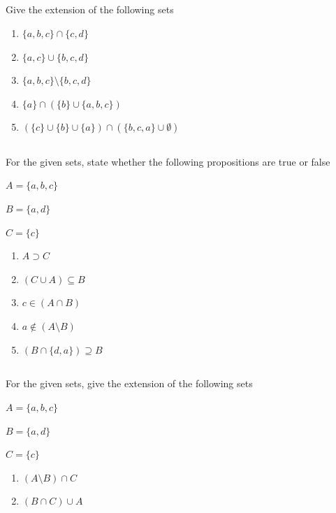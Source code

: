 \documentclass[twocolumn]{article}
\begin{document}
\subsection{}

    Give the extension of the following sets

    \begin{enumerate}
        \item $\{ a, b, c \} \cap \{ c, d \} $
        \item $\{ a, c \} \cup \{ b, c, d \} $
        \item $\{ a, b, c \} \setminus \{ b, c, d \} $
        \item $\{ a \} \cap ( \{ b \} \cup \{a, b, c\} ) $
        \item $ (\{ c \} \cup \{ b \} \cup \{a\}) \cap ( \{b, c, a\} \cup \emptyset ) $
    \end{enumerate}

\subsection{}

    For the given sets, state whether the following propositions are true or false

    $ A = \{ a, b, c \} $

    $ B = \{ a, d \} $

    $ C = \{ c \} $

    \begin{enumerate}
        \item $ A \supset C $
        \item $ (C \cup A) \subseteq B $
        \item $ c \in ( A \cap B ) $
        \item $ a \not \in ( A \setminus B ) $
        \item $(B \cap \{d, a\} ) \supseteq B$
    \end{enumerate}

\subsection{}

    For the given sets, give the extension of the following sets

    $ A = \{ a, b, c \} $

    $ B = \{ a, d \} $

    $ C = \{ c \} $

    \begin{enumerate}
        \item $ (A \setminus B) \cap C$
        \item $ ( B \cap C ) \cup A $
    \end{enumerate}
\end{document}
